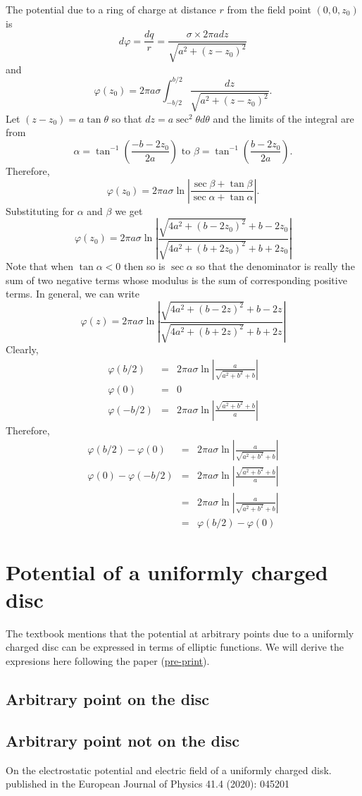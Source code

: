 \documentclass{article}
\begin{document}
\begin{enumerate}
The potential due to a ring of charge at distance $r$ from the field point 
$(0, 0, z_0)$ is
\[
d\varphi = \frac{dq}{r} = \frac{\sigma \times 2\pi adz}{\sqrt{a^2 + (z - z_0)^2}}
\]
and
\[
\varphi(z_0) = 2\pi a\sigma\int_{-b/2}^{b/2}\frac{dz}{\sqrt{a^2 + (z - z_0)^2}}.
\]
Let $(z - z_0) = a\tan\theta$ so that $dz = a\sec^2\theta d\theta$ and the limits
of the integral are from
\[
\alpha = \tan^{-1}\left(\frac{-b-2z_0}{2a}\right)  \text{ to } 
\beta = \tan^{-1}\left(\frac{b - 2z_0}{2a}\right).
\]
Therefore,
\[
\varphi(z_0) = 2\pi a\sigma\ln\left|\frac{\sec\beta + \tan\beta}{\sec\alpha + \tan\alpha}\right|.
\]
Substituting for $\alpha$ and $\beta$ we get
\[
\varphi(z_0) = 2\pi a\sigma\ln\left|\frac{\sqrt{4a^2 + (b - 2z_0)^2} + b - 2z_0}{\sqrt{4a^2 + (b + 2z_0)^2} + b + 2z_0}\right|
\]
Note that when $\tan\alpha < 0$ then so is $\sec\alpha$ so that the denominator 
is really the sum of two negative terms whose modulus is the sum of corresponding
positive terms. In general, we can write
\begin{equation}\label{e36}
\varphi(z) = 2\pi a\sigma\ln\left|\frac{\sqrt{4a^2 + (b - 2z)^2} + b - 2z}{\sqrt{4a^2 + (b + 2z)^2} + b + 2z}\right|
\end{equation}
Clearly,
\begin{eqnarray*}
\varphi(b/2) &=& 2\pi a\sigma\ln\left|\frac{a}{\sqrt{a^2+b^2} + b}\right| \\
\varphi(0) &=& 0 \\
\varphi(-b/2) &=& 2\pi a\sigma\ln\left|\frac{\sqrt{a^2+b^2} + b}{a}\right|
\end{eqnarray*}
Therefore,
\begin{eqnarray*}
\varphi(b/2) - \varphi(0) &=& 2\pi a\sigma\ln\left|\frac{a}{\sqrt{a^2+b^2} + b}\right| \\
\varphi(0) - \varphi(-b/2) &=& 2\pi a\sigma\ln\left|\frac{\sqrt{a^2+b^2} + b}{a}\right| \\
 &=& 2\pi a\sigma\ln\left|\frac{a}{\sqrt{a^2+b^2} + b}\right| \\
 &=& \varphi(b/2) - \varphi(0)
\end{eqnarray*}
\end{enumerate}

\section{Potential of a uniformly charged disc}
The textbook mentions that the potential at arbitrary points due to a uniformly
charged disc can be expressed in terms of elliptic functions. We will derive the
expresions here following the paper (\href{https://arxiv.org/pdf/2004.04540}{pre-print})\cite{bs}.
\subsection{Arbitrary point on the disc}
\subsection{Arbitrary point not on the disc}

\begin{thebibliography}{1}
 On the electrostatic potential and electric field of a uniformly charged disk.
published in the European Journal of Physics 41.4 (2020): 045201
\end{thebibliography}
\end{document}
